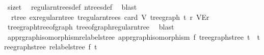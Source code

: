 \begin{isabellebody}
\ size{\isacharunderscore}{\kern0pt}t\ \isamarkupfalse%
\ regular{\isacharunderscore}{\kern0pt}n{\isacharunderscore}{\kern0pt}trees{\isacharunderscore}{\kern0pt}def\ n{\isacharunderscore}{\kern0pt}trees{\isacharunderscore}{\kern0pt}def\ \isamarkupfalse%
\ blast\isanewline
{}\isamarkupfalse%
%
\endisatagproof
{\isafoldproof}%
%
\isadelimproof
\isanewline
%
\endisadelimproof
\isanewline
{}\isamarkupfalse%
\ {\isacharparenleft}{\kern0pt}\ rtree{\isacharparenright}{\kern0pt}\ ex{\isacharunderscore}{\kern0pt}regular{\isacharunderscore}{\kern0pt}n{\isacharunderscore}{\kern0pt}tree{\isacharcolon}{\kern0pt}\ {\isachardoublequoteopen}{\isasymexists}t{\isasymin}regular{\isacharunderscore}{\kern0pt}n{\isacharunderscore}{\kern0pt}trees\ {\isacharparenleft}{\kern0pt}card\ V{\isacharparenright}{\kern0pt}{\isachardot}{\kern0pt}\ tree{\isacharunderscore}{\kern0pt}graph\ t\ {\isasymsimeq}\isactrlsub r\ {\isacharparenleft}{\kern0pt}V{\isacharcomma}{\kern0pt}E{\isacharcomma}{\kern0pt}r{\isacharparenright}{\kern0pt}{\isachardoublequoteclose}\isanewline
%
\isadelimproof
\ \ %
\endisadelimproof
%
\isatagproof
{}\isamarkupfalse%
\ tree{\isacharunderscore}{\kern0pt}graph{\isacharunderscore}{\kern0pt}tree{\isacharunderscore}{\kern0pt}of{\isacharunderscore}{\kern0pt}graph\ tree{\isacharunderscore}{\kern0pt}of{\isacharunderscore}{\kern0pt}graph{\isacharunderscore}{\kern0pt}regular{\isacharunderscore}{\kern0pt}n{\isacharunderscore}{\kern0pt}tree\ \isamarkupfalse%
\ blast%
\endisatagproof
{\isafoldproof}%
%
\isadelimproof
%
\endisadelimproof
%
\isadelimdocument
%
\endisadelimdocument
%
\isatagdocument
%
\isamarkuptrue%
%
\endisatagdocument
{\isafolddocument}%
%
\isadelimdocument
%
\endisadelimdocument
{}\isamarkupfalse%
\ app{\isacharunderscore}{\kern0pt}rgraph{\isacharunderscore}{\kern0pt}isomorphism{\isacharunderscore}{\kern0pt}relabel{\isacharunderscore}{\kern0pt}stree{\isacharcolon}{\kern0pt}\ {\isachardoublequoteopen}app{\isacharunderscore}{\kern0pt}rgraph{\isacharunderscore}{\kern0pt}isomorphism\ f\ {\isacharparenleft}{\kern0pt}tree{\isacharunderscore}{\kern0pt}graph{\isacharunderscore}{\kern0pt}stree\ t{\isacharparenright}{\kern0pt}\ {\isacharequal}{\kern0pt}\ tree{\isacharunderscore}{\kern0pt}graph{\isacharunderscore}{\kern0pt}stree\ {\isacharparenleft}{\kern0pt}relabel{\isacharunderscore}{\kern0pt}stree\ f\ t{\isacharparenright}{\kern0pt}{\isachardoublequoteclose}\isanewline
%
\isadelimproof

\end{isabellebody}

